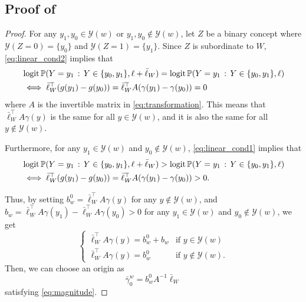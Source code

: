 \documentclass{article}
\newcommand{\yquad}{\mathcal{Y}}
\begin{document}
\subsection{Proof of }
\Magnitude*
\begin{proof}
  For any $y_1, y_0 \in \yquad(w)$ or $y_1, y_0 \not\in \yquad(w)$, let $Z$ be a binary concept where $\yquad(Z = 0) = \{y_0\}$ and $\yquad(Z = 1) = \{y_1\}$.
  Since $Z$ is subordinate to $W$, \cref{eq:linear_cond2} implies that
  \begin{align}
    & \logit \Pr(Y = y_1 \given Y \in \{y_0, y_1\} , \ell +  \bar\ell_W )= \logit \Pr(Y = y_1 \given Y \in \{y_0, y_1\} , \ell)\\
    & \iff  \bar\ell_W ^\top  (g(y_1) - g(y_0))=\bar\ell_W ^\top  A(\gamma(y_1) - \gamma(y_0)) = 0
  \end{align}
  where $A$ is the invertible matrix in \cref{eq:transformation}.
  This means that $\bar\ell_W^\top A \gamma(y)$ is the same for all $y\in \yquad(w)$, and it is also the same for all $y\not\in \yquad(w)$.

  Furthermore, for any $y_1 \in \yquad(w)$ and $y_0 \not\in \yquad(w)$, \cref{eq:linear_cond1} implies that
  \begin{align}
    & \logit \Pr(Y = y_1 \given Y \in \{y_0, y_1\} , \ell + \bar\ell_W )> \logit \Pr(Y = y_1 \given Y \in \{y_0, y_1\} , \ell)\\
    & \iff  \bar\ell_W ^\top  (g(y_1) - g(y_0)) =  \bar\ell_W ^\top  A(\gamma(y_1) - \gamma(y_0))> 0.
  \end{align}

  Thus, by setting $b_w^0 = \bar\ell_W^\top A \gamma(y)$ for any $y \not\in \yquad(w)$, and $b_w = \bar\ell_W^\top A \gamma(y_1) - \bar\ell_W^\top A \gamma(y_0) > 0$ for any $y_1 \in \yquad(w)$ and $y_0 \not\in \yquad(w)$, we get
  \begin{equation}\label{eq:feature_vector}
    \begin{cases}
      \bar\ell_W^\top A \gamma(y) = b_w^0 + b_w & \text{if } y\in \yquad(w)\\
      \bar\ell_W^\top A \gamma(y) = b_w^0 & \text{if } y \not\in \yquad(w).
    \end{cases}
  \end{equation}
  Then, we can choose an origin as
  \begin{equation}
    \bar\gamma_0^w = b_w^0 A^{-1} \bar\ell_W
  \end{equation}
  satisfying \cref{eq:magnitude}.


\end{proof}
\end{document}
